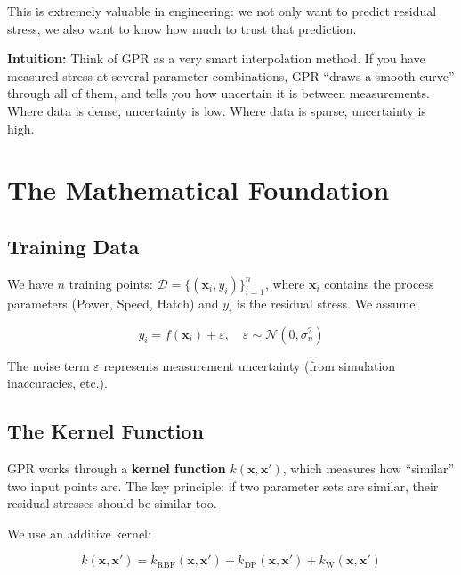 \documentclass[12pt,a4paper]{report}
\begin{document}
This is extremely valuable in engineering: we not only want to predict residual stress, we also want to know how much to trust that prediction.

\begin{keybox}
\textbf{Intuition:} Think of GPR as a very smart interpolation method. If you have measured stress at several parameter combinations, GPR ``draws a smooth curve'' through all of them, and tells you how uncertain it is between measurements. Where data is dense, uncertainty is low. Where data is sparse, uncertainty is high.
\end{keybox}

\section{The Mathematical Foundation}

\subsection{Training Data}

We have $n$ training points: $\mathcal{D} = \{(\mathbf{x}_i, y_i)\}_{i=1}^n$, where $\mathbf{x}_i$ contains the process parameters (Power, Speed, Hatch) and $y_i$ is the residual stress. We assume:

\begin{equation}
y_i = f(\mathbf{x}_i) + \varepsilon, \quad \varepsilon \sim \mathcal{N}(0, \sigma_n^2)
\end{equation}

The noise term $\varepsilon$ represents measurement uncertainty (from simulation inaccuracies, etc.).

\subsection{The Kernel Function}

GPR works through a \textbf{kernel function} $k(\mathbf{x}, \mathbf{x}')$, which measures how ``similar'' two input points are. The key principle: if two parameter sets are similar, their residual stresses should be similar too.

We use an additive kernel:

\begin{equation}
k(\mathbf{x}, \mathbf{x}') = k_{\text{RBF}}(\mathbf{x}, \mathbf{x}') + k_{\text{DP}}(\mathbf{x}, \mathbf{x}') + k_{\text{W}}(\mathbf{x}, \mathbf{x}')
\end{equation}
\end{document}
